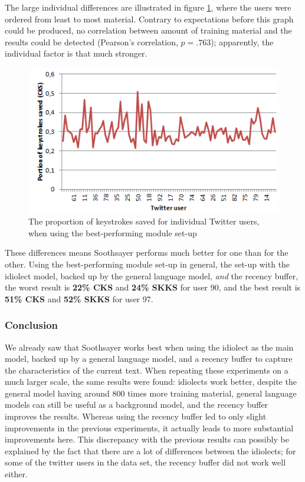 \documentclass[12pt]{article}
\begin{document}
The large individual differences are illustrated in figure \ref{chaos}, where the users were ordered from least to most material. Contrary to expectations before this graph could be produced, no correlation between amount of training material and the results could be detected (Pearson's correlation, $p = .763$); apparently, the individual factor is that much stronger.

\begin{figure}[H] \centering
\includegraphics[scale=1]{twitter_chaos}
\caption{The proportion of keystrokes saved for individual Twitter users, when using the best-performing module set-up}
\label{chaos}
\end{figure} 

These differences means Soothsayer performs much better for one than for the other. Using the best-performing module set-up in general, the set-up with the idiolect model, backed up by the general language model, \emph{and} the recency buffer, the worst result is \textbf{22\% CKS} and \textbf{24\% SKKS} for user 90, and the best result is \textbf{51\% CKS} and \textbf{52\% SKKS} for user 97.

\subsubsection{Conclusion}
We already saw that Soothsayer works best when using the idiolect as the main model, backed up by a general language model, and a recency buffer to capture the characteristics of the current text. When repeating these experiments on a much larger scale, the same results were found: idiolects work better, despite the general model having around 800 times more training material, general language models can still be useful as a background model, and the recency buffer improves the results. Whereas using the recency buffer led to only slight improvements in the previous experiments, it actually leads to more substantial improvements here. This discrepancy with the previous results can possibly be explained by the fact that there are a lot of differences between the idiolects; for some of the twitter users in the data set, the recency buffer did not work well either.
\end{document}
